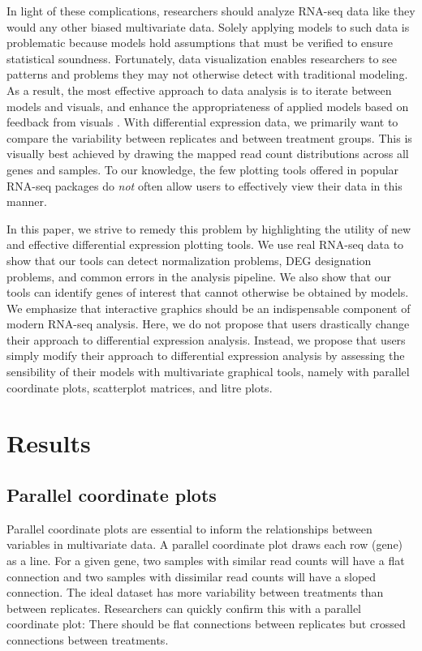 \documentclass{bmcart}
\begin{document}
\begin{linenumbers}
\begin{doublespacing}
In light of these complications, researchers should analyze RNA-seq data like they would any other biased multivariate data. Solely applying models to such data is problematic because models hold assumptions that must be verified to ensure statistical soundness. Fortunately, data visualization enables researchers to see patterns and problems they may not otherwise detect with traditional modeling. As a result, the most effective approach to data analysis is to iterate between models and visuals, and enhance the appropriateness of applied models based on feedback from visuals \cite{Shneiderman}. With differential expression data, we primarily want to compare the variability between replicates and between treatment groups. This is visually best achieved by drawing the mapped read count distributions across all genes and samples. To our knowledge, the few plotting tools offered in popular RNA-seq packages do \textit{not} often allow users to effectively view their data in this manner.

In this paper, we strive to remedy this problem by highlighting the utility of new and effective differential expression plotting tools. We use real RNA-seq data to show that our tools can detect normalization problems, DEG designation problems, and common errors in the analysis pipeline. We also show that our tools can identify genes of interest that cannot otherwise be obtained by models. We emphasize that interactive graphics should be an indispensable component of modern RNA-seq analysis. Here, we do not propose that users drastically change their approach to differential expression analysis. Instead, we propose that users simply modify their approach to differential expression analysis by assessing the sensibility of their models with multivariate graphical tools, namely with parallel coordinate plots, scatterplot matrices, and litre plots.

\section*{Results}

\subsection*{Parallel coordinate plots}

Parallel coordinate plots are essential to inform the relationships between variables in multivariate data. A parallel coordinate plot draws each row (gene) as a line. For a given gene, two samples with similar read counts will have a flat connection and two samples with dissimilar read counts will have a sloped connection. The ideal dataset has more variability between treatments than between replicates. Researchers can quickly confirm this with a parallel coordinate plot: There should be flat connections between replicates but crossed connections between treatments.


\end{doublespacing}
\end{linenumbers}
\end{document}
